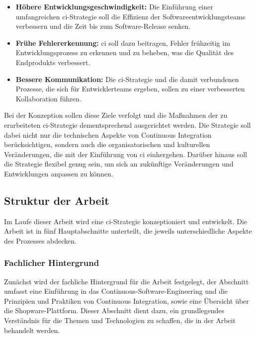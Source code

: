 \begin{itemize}
    \item \textbf{Höhere Entwicklungsgeschwindigkeit:} Die Einführung einer umfangreichen \acrshort{ci}-Strategie soll
          die Effizienz der Softwareentwicklungsteams verbessern und die Zeit bis zum Software-Release senken.

    \item \textbf{Frühe Fehlererkennung:} \acrshort{ci} soll dazu beitragen, Fehler frühzeitig im Entwicklungsprozess zu
          erkennen und zu beheben, was die Qualität des Endprodukts verbessert.

    \item \textbf{Bessere Kommunikation:} Die \acrshort{ci}-Strategie und die damit verbundenen Prozesse, die sich für
          Entwicklerteams ergeben, sollen zu einer verbesserten Kollaboration führen.
\end{itemize}

Bei der Konzeption sollen diese Ziele verfolgt und die Maßnahmen der zu erarbeiteten \acrshort{ci}-Strategie
dementsprechend ausgerichtet werden.
Die Strategie soll dabei nicht nur die technischen Aspekte von Continuous Integration berücksichtigen, sondern auch die
organisatorischen und kulturellen Veränderungen, die mit der Einführung von \acrshort{ci} einhergehen.
Darüber hinaus soll die Strategie flexibel genug sein, um sich an zukünftige Veränderungen und Entwicklungen anpassen
zu können.

\subsection{Struktur der Arbeit} \label{subsec:01-introduction-3}

Im Laufe dieser Arbeit wird eine \acrshort{ci}-Strategie konzeptioniert und entwickelt.
Die Arbeit ist in fünf Hauptabschnitte unterteilt, die jeweils unterschiedliche Aspekte des Prozesses abdecken.

\subsubsection{Fachlicher Hintergrund}

Zunächst wird der fachliche Hintergrund für die Arbeit festgelegt, der Abschnitt umfasst eine Einführung in das
Continuous-Software-Engineering und die Prinzipien und Praktiken von Continuous Integration, sowie eine Übersicht über die
Shopware-Plattform.
Dieser Abschnitt dient dazu, ein grundlegendes Verständnis für die Themen und Technologien zu schaffen, die in der
Arbeit behandelt werden.

